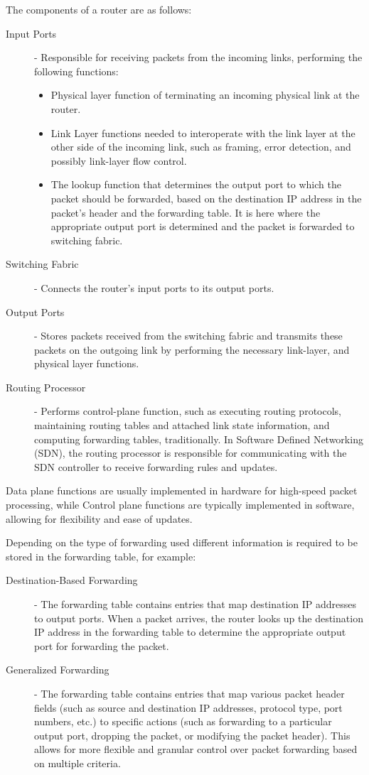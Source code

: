 \documentclass[12pt letter]{report}
\begin{document}
The components of a router are as follows:
\begin{description}
  \item[Input Ports] - Responsible for receiving packets from the
    incoming links, performing the following functions:
    \begin{itemize}
      \item Physical layer function of terminating an incoming
        physical link at the router.
      \item Link Layer functions needed to interoperate with the link
        layer at the other side of the incoming link, such as
        framing, error detection, and possibly link-layer flow control.
      \item The lookup function that determines the output port to
        which the packet should be forwarded, based on the
        destination IP address in the packet's header and the
        forwarding table. It is here where the appropriate output
        port is determined and the packet is forwarded to switching fabric.
    \end{itemize}
  \item[Switching Fabric] - Connects the router's input ports to its
    output ports.
  \item[Output Ports] - Stores packets received from the switching
    fabric and transmits these packets on the outgoing link by
    performing the necessary link-layer, and physical layer functions.
  \item[Routing Processor] - Performs control-plane function, such as
    executing routing protocols, maintaining routing tables and
    attached link state information, and computing forwarding tables,
    traditionally. In Software Defined Networking (SDN), the routing
    processor is responsible for communicating with the SDN
    controller to receive forwarding rules and updates.
\end{description}

Data plane functions are usually implemented in hardware for
high-speed packet processing, while Control plane functions are
typically implemented in software, allowing for flexibility and ease of updates.

Depending on the type of forwarding used different information is
required to be stored in the forwarding table, for example:
\begin{description}
  \item[Destination-Based Forwarding] - The forwarding table contains
    entries that map destination IP addresses to output ports. When a
    packet arrives, the router looks up the destination IP address in
    the forwarding table to determine the appropriate output port for
    forwarding the packet.
  \item[Generalized Forwarding] - The forwarding table contains entries that map
    various packet header fields (such as source and destination IP
    addresses, protocol type, port numbers, etc.) to specific
    actions (such as forwarding to a particular output port, dropping
    the packet, or modifying the packet header). This allows for more
    flexible and granular control over packet forwarding based on
    multiple criteria.
\end{description}
\end{document}
